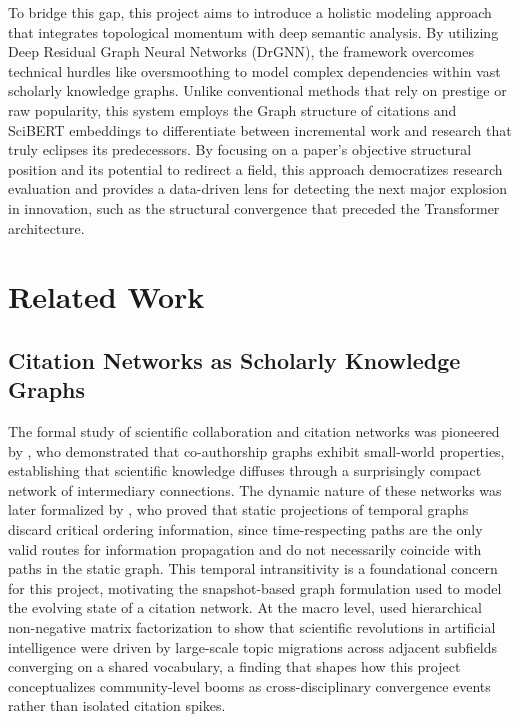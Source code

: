 \documentclass[a4paper,12pt]{article}
\begin{document}
To bridge this gap, this project aims to introduce a holistic modeling approach that integrates 
topological momentum with deep semantic analysis. By utilizing Deep Residual Graph Neural 
Networks (DrGNN)\parencite{zhang_gresnet_2019}, the framework overcomes technical hurdles 
like oversmoothing to model complex dependencies within vast scholarly knowledge graphs. 
Unlike conventional methods that rely on prestige or raw popularity, this system employs 
the Graph structure of citations and SciBERT\parencite{beltagy_scibert_2019} embeddings 
to differentiate between incremental work and research that truly eclipses its predecessors. 
By focusing on a paper’s objective structural position and its potential to redirect a field, 
this approach democratizes research evaluation and provides a data-driven lens for detecting 
the next major explosion in innovation, such as the structural convergence that preceded the 
Transformer architecture.

\newpage

\section{Related Work}

\subsection{Citation Networks as Scholarly Knowledge Graphs}

The formal study of scientific collaboration and citation networks was pioneered by \parencite{newman_structure_2001}, who demonstrated that co-authorship graphs exhibit small-world properties, establishing that scientific knowledge diffuses through a surprisingly compact network of intermediary connections. The dynamic nature of these networks was later formalized by \parencite{holme_temporal_2012}, who proved that static projections of temporal graphs discard critical ordering information, since time-respecting paths are the only valid routes for information propagation and do not necessarily coincide with paths in the static graph. This temporal intransitivity is a foundational concern for this project, motivating the snapshot-based graph formulation used to model the evolving state of a citation network. At the macro level, \parencite{qian_understanding_2020} used hierarchical non-negative matrix factorization to show that scientific revolutions in artificial intelligence were driven by large-scale topic migrations across adjacent subfields converging on a shared vocabulary, a finding that shapes how this project conceptualizes community-level booms as cross-disciplinary convergence events rather than isolated citation spikes.
\end{document}
